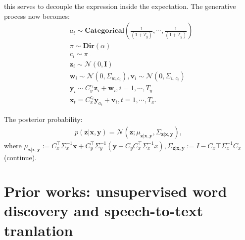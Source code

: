 \documentclass[journal]{IEEEtran}
\newcommand{\bI}{\mathbf I}
\newcommand{\bv}{\mathbf v}
\newcommand{\bw}{\mathbf w}
\newcommand{\bx}{\mathbf x}
\newcommand{\by}{\mathbf y}
\newcommand{\bz}{\mathbf z}
\begin{document}
this serves to decouple the expression inside the expectation. The generative process now becomes:
\begin{align}\label{eq:audio_region_repara_gp}
    &a_t \sim \mathbf{Categorical}(\frac{1}{(1+T_y)}, \cdots, \frac{1}{(1+T_y)})\\
    &\pi \sim \mathbf{Dir}(\alpha)\\
    &c_i \sim \pi\\
    &\bz_i \sim \mathcal N(0, \bI)\\ 
    &\bw_i \sim \mathcal N(0, \Sigma_{w, c_i}), \bv_i \sim \mathcal N(0, \Sigma_{v, c_i})\\
    &\by_i \sim C_y^{c_i}\bz_i + \bw_i, i=1,\cdots,T_y\\
    &\bx_t = C_x^{c_i} \by_{a_t} + \bv_i, t=1,\cdots,T_x.
\end{align}

The posterior probability:
\begin{align*}
    p(\mathbf z|\mathbf x, \mathbf y) = \mathcal N(\mathbf z; \mu_{\mathbf z|\mathbf x, \mathbf y}, \Sigma_{\mathbf z|\mathbf x, \mathbf y}),
\end{align*}
where $\mu_{\mathbf z|\mathbf x, \mathbf y} := C_x^\top \Sigma_x^{-1}\mathbf x + C_y^\top \Sigma_y^{-1}(\mathbf y - C_y C_x^\top \Sigma_x^{-1}x), \Sigma_{\mathbf z|\mathbf x, \mathbf y} := I - C_x\top \Sigma_x^{-1} C_x $(continue).

\section{Prior works: unsupervised word discovery and speech-to-text tranlation}
\end{document}

